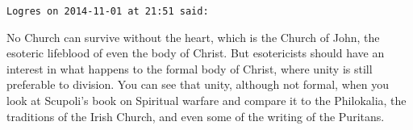 \begin{footnotesize}
\begin{sffamily}
\hfill

\texttt{Logres on 2014-11-01 at 21:51 said:}

No Church can survive without the heart, which is the Church of John, the esoteric lifeblood of even the body of Christ. But esotericists should have an interest in what happens to the formal body of Christ, where unity is still preferable to division. You can see that unity, although not formal, when you look at Scupoli's book on Spiritual warfare and compare it to the Philokalia, the traditions of the Irish Church, and even some of the writing of the Puritans.


\hfill

\end{sffamily}
\end{footnotesize}

